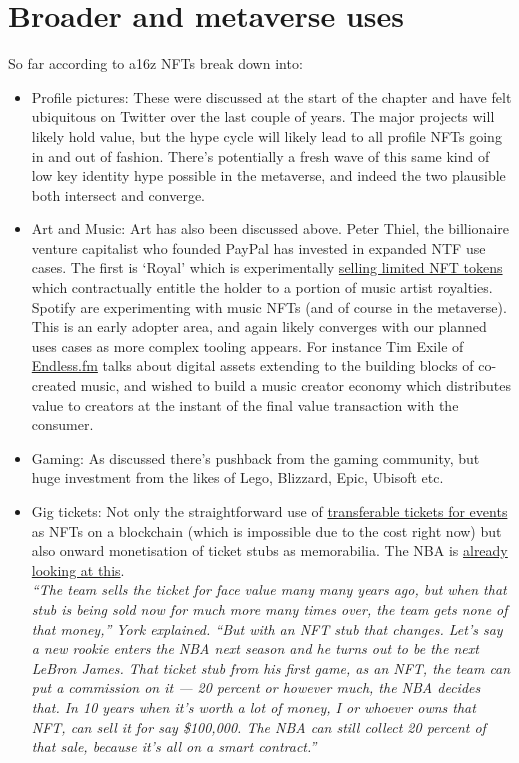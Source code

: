 \section{Broader and metaverse uses}
So far according to a16z NFTs break down into:
\begin{itemize}
\item Profile pictures: These were discussed at the start of the chapter and have felt ubiquitous on Twitter over the last couple of years. The major projects will likely hold value, but the hype cycle will likely lead to all profile NFTs going in and out of fashion. There's potentially a fresh wave of this same kind of low key identity hype possible in the metaverse, and indeed the two plausible both intersect and converge.
\item Art and Music: Art has also been discussed above. Peter Thiel, the billionaire venture capitalist who founded PayPal has invested in expanded NTF use cases. The first is `Royal' which is experimentally \href{https://royal.io/}{selling limited NFT tokens} which contractually entitle the holder to a portion of music artist royalties. Spotify are experimenting with music NFTs (and of course in the metaverse). This is an early adopter area, and again likely converges with our planned uses cases as more complex tooling appears. For instance Tim Exile of \href{https://endlesss.fm/}{Endless.fm} talks about digital assets extending to the building blocks of co-created music, and wished to build a music creator economy which distributes value to creators at the instant of the final value transaction with the consumer.
\item Gaming: As discussed there's pushback from the gaming community, but huge investment from the likes of Lego, Blizzard, Epic, Ubisoft etc.
\item Gig tickets: Not only the straightforward use of \href{https://news.yahoo.com/psg-sells-us-220-000-030927515.html}{transferable tickets for events} as NFTs on a blockchain (which is impossible due to the cost right now) but also onward monetisation of ticket stubs as memorabilia. The NBA is \href{https://deadspin.com/investing-in-nft-ticket-stubs-is-likely-one-of-the-nba-1848991991}{already looking at this}.\\
\textit{``The team sells the ticket for face value many many years ago, but when that stub is being sold now for much more many times over, the team gets none of that money,'' York explained. ``But with an NFT stub that changes. Let’s say a new rookie enters the NBA next season and he turns out to be the next LeBron James. That ticket stub from his first game, as an NFT, the team can put a commission on it — 20 percent or however much, the NBA decides that. In 10 years when it’s worth a lot of money, I or whoever owns that NFT, can sell it for say \$100,000. The NBA can still collect 20 percent of that sale, because it’s all on a smart contract.''}\par

\end{itemize}
